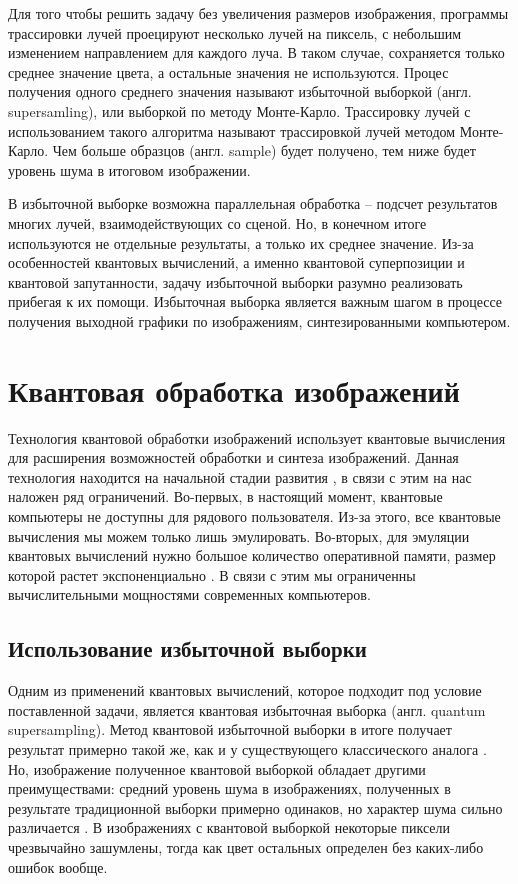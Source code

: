 Для того чтобы решить задачу без увеличения размеров изображения, программы трассировки лучей проецируют несколько лучей на пиксель, с небольшим изменением направлением для каждого луча. В таком случае, сохраняется только среднее значение цвета, а остальные значения не используются. Процес получения одного среднего значения называют избыточной выборкой (англ. supersamling), или выборкой по методу Монте-Карло. Трассировку лучей с использованием такого алгоритма называют трассировкой лучей методом Монте-Карло. Чем больше образцов (англ. sample) будет получено, тем ниже будет уровень шума в итоговом изображении. 

В избыточной выборке возможна параллельная обработка -- подсчет результатов многих лучей, взаимодействующих со сценой. Но, в конечном итоге используются не отдельные результаты, а только их среднее значение. Из-за особенностей квантовых вычислений, а именно квантовой суперпозиции и квантовой запутанности, задачу избыточной выборки разумно реализовать прибегая к их помощи. Избыточная выборка является важным шагом в процессе получения выходной графики по изображениям, синтезированными компьютером.

\section{Квантовая обработка изображений}

Технология квантовой обработки изображений использует квантовые вычисления для расширения возможностей обработки и синтеза изображений. Данная технология находится на начальной стадии развития \cite{state}, в связи с этим на нас наложен ряд ограничений. Во-первых, в настоящий момент, квантовые компьютеры не доступны для рядового пользователя. Из-за этого, все квантовые вычисления мы можем только лишь эмулировать. Во-вторых, для эмуляции квантовых вычислений нужно большое количество оперативной памяти, размер которой растет экспоненциально \cite{emulating}. В связи с этим мы ограниченны вычислительными мощностями современных компьютеров.

\subsection{Использование избыточной выборки}

Одним из применений квантовых вычислений, которое подходит под условие поставленной задачи, является квантовая избыточная выборка (англ. quantum supersampling). Метод квантовой избыточной выборки в итоге получает результат примерно такой же, как и у существующего классического аналога \cite{PQC-classic}. Но, изображение полученное квантовой выборкой обладает другими преимуществами: средний уровень шума в изображениях, полученных в результате традиционной выборки примерно одинаков, но характер шума сильно различается \cite{PQC-classic}. В изображениях с квантовой выборкой некоторые пиксели чрезвычайно зашумлены, тогда как цвет остальных определен без каких-либо ошибок вообще.
 
